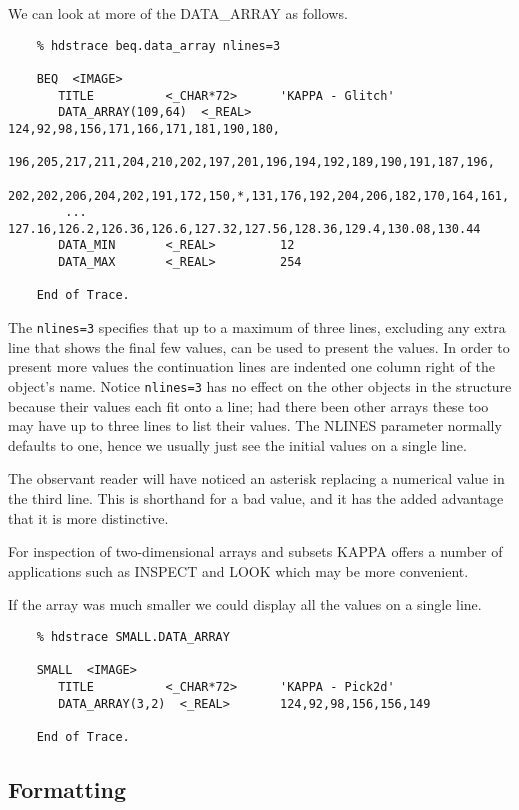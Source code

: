 We can look at more of the DATA\_ARRAY as follows.

\small
\begin{verbatim}
    % hdstrace beq.data_array nlines=3
   
    BEQ  <IMAGE>
       TITLE          <_CHAR*72>      'KAPPA - Glitch'
       DATA_ARRAY(109,64)  <_REAL>    124,92,98,156,171,166,171,181,190,180,
        196,205,217,211,204,210,202,197,201,196,194,192,189,190,191,187,196,
        202,202,206,204,202,191,172,150,*,131,176,192,204,206,182,170,164,161,
        ... 127.16,126.2,126.36,126.6,127.32,127.56,128.36,129.4,130.08,130.44
       DATA_MIN       <_REAL>         12
       DATA_MAX       <_REAL>         254
 
    End of Trace.
\end{verbatim}
\normalsize
The {\tt nlines=3} specifies that up to a maximum of three lines, 
excluding any extra line that shows the final few values, can be
used to present the values.  In order to present more values the 
continuation lines are indented one column right of the object's name.
Notice {\tt nlines=3} has no effect on the other objects in the 
structure because their values each fit onto a line; had there been
other arrays these too may have up to three lines to list their
values.  The NLINES parameter normally defaults to one, hence we usually
just see the initial values on a single line.

The observant reader will have noticed an asterisk replacing a numerical
value in the third line.  This is shorthand for a bad value, and it
has the added advantage that it is more distinctive.

For inspection of two-dimensional arrays and subsets {\footnotesize KAPPA}
offers a number of applications such as INSPECT and LOOK which may be
more convenient. 

If the array was much smaller we could display all the values on a single 
line.

\small
\begin{verbatim}
    % hdstrace SMALL.DATA_ARRAY
   
    SMALL  <IMAGE>
       TITLE          <_CHAR*72>      'KAPPA - Pick2d'
       DATA_ARRAY(3,2)  <_REAL>       124,92,98,156,156,149
 
    End of Trace.
\end{verbatim}
\normalsize
\subsection{Formatting}

